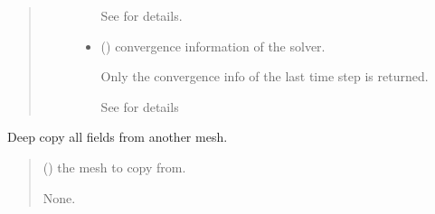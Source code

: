 \documentclass[letterpaper,10pt,english]{sphinxmanual}
\begin{document}
\begin{fulllineitems}
\begin{fulllineitems}
\begin{quote}
\begin{description}
\begin{itemize}
\sphinxAtStartPar
See {\hyperref[\detokenize{_autosummary/nirfasterff.base.data.TPSFdata:nirfasterff.base.data.TPSFdata}]{}} for details.

\item {} 
\sphinxAtStartPar
{} () \textendash{} convergence information of the solver.

\sphinxAtStartPar
Only the convergence info of the last time step is returned.

\sphinxAtStartPar
See {\hyperref[\detokenize{_autosummary/nirfasterff.utils.ConvergenceInfo:nirfasterff.utils.ConvergenceInfo}]{}} for details

\end{itemize}


\end{description}\end{quote}

\end{fulllineitems}


\begin{fulllineitems}
\label{\detokenize{_autosummary/nirfasterff.base.stnd_mesh.stndmesh:nirfasterff.base.stnd_mesh.stndmesh.from_copy}}
\pysigstartsignatures
{}
\pysigstopsignatures
\sphinxAtStartPar
Deep copy all fields from another mesh.
\begin{quote}\begin{description}
\sphinxAtStartPar
{} () \textendash{} the mesh to copy from.

\sphinxAtStartPar
None.

\end{description}\end{quote}

\end{fulllineitems}



\end{fulllineitems}
\end{document}
